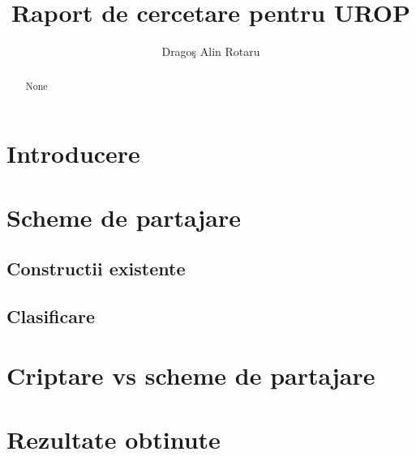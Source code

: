 \documentclass{llncs}
\begin{document}
\pagestyle{empty}
%
%
\title{Raport de cercetare pentru UROP}
%
%
\author{Drago\c{s} Alin Rotaru}
%



\maketitle              %

\begin{abstract}
  None
\end{abstract}
%
\section{Introducere}
\label{sec:intro}

\section{Scheme de partajare}
\label{sec:encryption}

\subsection{Constructii existente}
\subsection{Clasificare}

\section{Criptare vs scheme de partajare}
\label{sec:crypt_vs_sharing}

\section{Rezultate obtinute}
\end{document}
